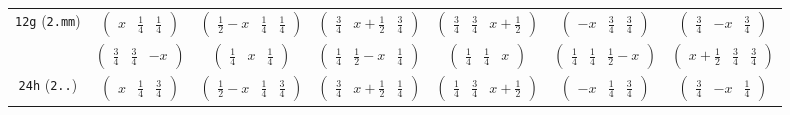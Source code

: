\documentclass[fleqn,9pt,landscape]{jsarticle}
\begin{document}
\begin{center}
\begin{longtable}{ccccccc}
{\tt 12g} ({\tt 2.mm}) & $ \begin{pmatrix} x & \frac{1}{4} & \frac{1}{4} \end{pmatrix} $ & $ \begin{pmatrix} \frac{1}{2} - x & \frac{1}{4} & \frac{1}{4} \end{pmatrix} $ & $ \begin{pmatrix} \frac{3}{4} & x + \frac{1}{2} & \frac{3}{4} \end{pmatrix} $ & $ \begin{pmatrix} \frac{3}{4} & \frac{3}{4} & x + \frac{1}{2} \end{pmatrix} $ & $ \begin{pmatrix} - x & \frac{3}{4} & \frac{3}{4} \end{pmatrix} $ & $ \begin{pmatrix} \frac{3}{4} & - x & \frac{3}{4} \end{pmatrix} $ \\
& $ \begin{pmatrix} \frac{3}{4} & \frac{3}{4} & - x \end{pmatrix} $ & $ \begin{pmatrix} \frac{1}{4} & x & \frac{1}{4} \end{pmatrix} $ & $ \begin{pmatrix} \frac{1}{4} & \frac{1}{2} - x & \frac{1}{4} \end{pmatrix} $ & $ \begin{pmatrix} \frac{1}{4} & \frac{1}{4} & x \end{pmatrix} $ & $ \begin{pmatrix} \frac{1}{4} & \frac{1}{4} & \frac{1}{2} - x \end{pmatrix} $ & $ \begin{pmatrix} x + \frac{1}{2} & \frac{3}{4} & \frac{3}{4} \end{pmatrix} $ \\ \hline
{\tt 24h} ({\tt 2..}) & $ \begin{pmatrix} x & \frac{1}{4} & \frac{3}{4} \end{pmatrix} $ & $ \begin{pmatrix} \frac{1}{2} - x & \frac{1}{4} & \frac{3}{4} \end{pmatrix} $ & $ \begin{pmatrix} \frac{3}{4} & x + \frac{1}{2} & \frac{1}{4} \end{pmatrix} $ & $ \begin{pmatrix} \frac{1}{4} & \frac{3}{4} & x + \frac{1}{2} \end{pmatrix} $ & $ \begin{pmatrix} - x & \frac{1}{4} & \frac{3}{4} \end{pmatrix} $ & $ \begin{pmatrix} \frac{3}{4} & - x & \frac{1}{4} \end{pmatrix} $ \\

\end{longtable}
\end{center}
\end{document}
